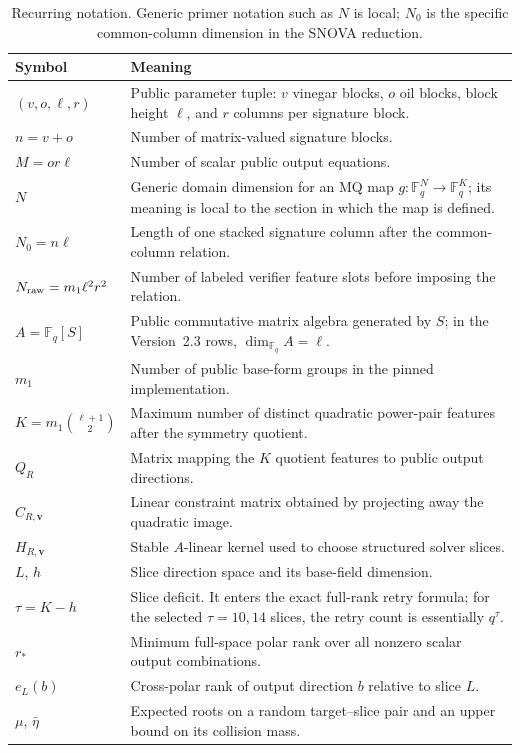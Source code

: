 \documentclass[11pt]{article}
\newcommand{\F}{\mathbb F}
\newcommand{\SNOVA}{\textsf{SNOVA}}
\begin{document}
\begin{table}[H]
\centering
\caption{Recurring notation.  Generic primer notation such as $N$ is local;
$N_0$ is the specific common-column dimension in the \SNOVA{} reduction.}
\label{tab:notation}
\small
\renewcommand{\arraystretch}{1.12}
\begin{tabularx}{0.96\textwidth}{@{}>{\raggedright\arraybackslash}p{}X@{}}
\toprule
Symbol & Meaning\\
\midrule
$(v,o,\ell,r)$ & Public parameter tuple: $v$ vinegar blocks, $o$ oil blocks,
block height $\ell$, and $r$ columns per signature block.\\
$n=v+o$ & Number of matrix-valued signature blocks.\\
$M=or\ell$ & Number of scalar public output equations.\\
$N$ & Generic domain dimension for an MQ map $g:\F_q^N\to\F_q^K$; its
meaning is local to the section in which the map is defined.\\
$N_0=n\ell$ & Length of one stacked signature column after the common-column
relation.\\
$N_{\rm raw}=m_1\ell^2r^2$ & Number of labeled verifier feature slots before imposing
the relation.\\
$A=\F_q[S]$ & Public commutative matrix algebra generated by $S$; in the
Version~2.3 rows, $\dim_{\F_q}A=\ell$.\\
$m_1$ & Number of public base-form groups in the pinned implementation.\\
$K=m_1\binom{\ell+1}{2}$ & Maximum number of distinct quadratic power-pair
features after the symmetry quotient.\\
$Q_R$ & Matrix mapping the $K$ quotient features to public output directions.\\
$C_{R,\mathbf v}$ & Linear constraint matrix obtained by projecting away the quadratic
image.\\
$H_{R,\mathbf v}$ & Stable $A$-linear kernel used to choose structured solver slices.\\
$L$, $h$ & Slice direction space and its base-field dimension.\\
$\tau=K-h$ & Slice deficit.  It enters the exact full-rank retry formula;
for the selected $\tau=10,14$ slices, the retry count is essentially $q^\tau$.\\
$r_*$ & Minimum full-space polar rank over all nonzero scalar output
combinations.\\
$e_L(b)$ & Cross-polar rank of output direction $b$ relative to slice $L$.\\
$\mu$, $\bar\eta$ & Expected roots on a random target--slice pair and an upper
bound on its collision mass.\\
\bottomrule
\end{tabularx}
\end{table}
\end{document}
